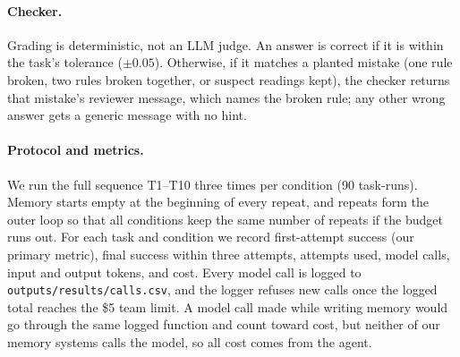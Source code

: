 \paragraph{Checker.}
Grading is deterministic, not an LLM judge. An answer is correct if it is within the
task's tolerance ($\pm 0.05$). Otherwise, if it matches a planted mistake (one rule
broken, two rules broken together, or suspect readings kept), the checker returns that
mistake's reviewer message, which names the broken rule; any other wrong answer gets a
generic message with no hint.

\paragraph{Protocol and metrics.}
We run the full sequence T1--T10 three times per condition (90 task-runs). Memory starts
empty at the beginning of every repeat, and repeats form the outer loop so that all
conditions keep the same number of repeats if the budget runs out. For each task and
condition we record first-attempt success (our primary metric), final success within three
attempts, attempts used, model calls, input and output tokens, and cost. Every model call
is logged to \texttt{outputs/results/calls.csv}, and the logger refuses new calls once the
logged total reaches the \$5 team limit. A model call made while writing memory would go
through the same logged function and count toward cost, but neither of our memory systems
calls the model, so all cost comes from the agent.
